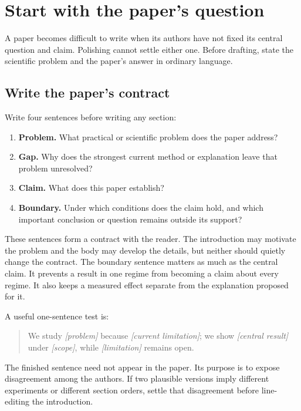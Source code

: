 \section{Start with the paper's question}
\label{sec:start}

A paper becomes difficult to write when its authors have not fixed its central
question and claim. Polishing cannot settle either one. Before drafting, state
the scientific problem and the paper's answer in ordinary language.

\subsection{Write the paper's contract}

Write four sentences before writing any section:

\begin{enumerate}[leftmargin=*,label=\arabic*.]
    \item \textbf{Problem.} What practical or scientific problem does the paper
    address?
    \item \textbf{Gap.} Why does the strongest current method or explanation
    leave that problem unresolved?
    \item \textbf{Claim.} What does this paper establish?
    \item \textbf{Boundary.} Under which conditions does the claim hold, and
    which important conclusion or question remains outside its support?
\end{enumerate}

These sentences form a contract with the reader. The introduction may motivate
the problem and the body may develop the details, but neither should quietly
change the contract. The boundary sentence matters as much as the central
claim. It prevents a result in one regime from becoming a claim about every
regime. It also keeps a measured effect separate from the explanation proposed
for it.

A useful one-sentence test is:

\begin{quote}
We study \emph{[problem]} because \emph{[current limitation]}; we show
\emph{[central result]} under \emph{[scope]}, while \emph{[limitation]} remains
open.
\end{quote}

The finished sentence need not appear in the paper. Its purpose is to expose
disagreement among the authors. If two plausible versions imply different
experiments or different section orders, settle that disagreement before
line-editing the introduction.

